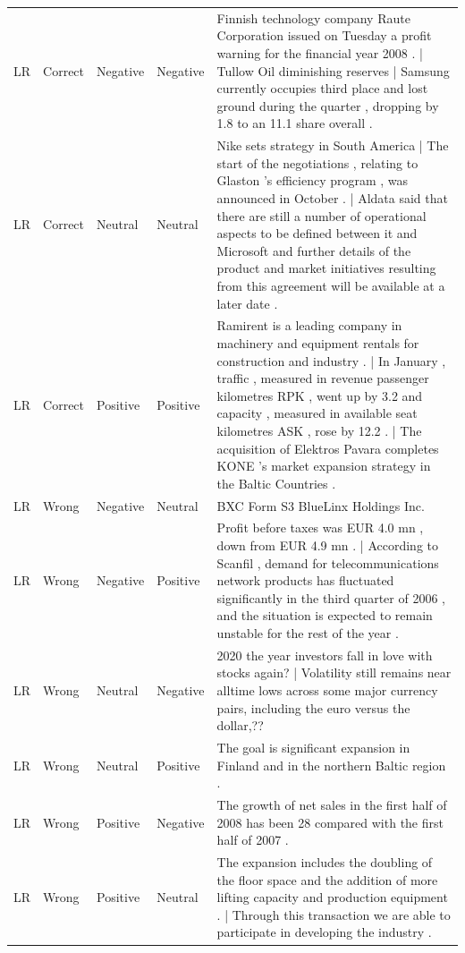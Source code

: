 \begin{longtable}{p{1.8cm}p{1.5cm}p{1.8cm}p{1.8cm}p{16.5cm}}
\bottomrule
\endlastfoot
LR & Correct & Negative & Negative & Finnish technology company Raute Corporation issued on Tuesday a profit warning for the financial year 2008 .    |   Tullow Oil diminishing reserves    |   Samsung currently occupies third place and lost ground during the quarter , dropping by 1.8 to an 11.1 share overall . \\
LR & Correct & Neutral & Neutral & Nike sets strategy in South America    |   The start of the negotiations , relating to Glaston 's efficiency program , was announced in October .    |   Aldata said that there are still a number of operational aspects to be defined between it and Microsoft and further details of the product and market initiatives resulting from this agreement will be available at a later date . \\
LR & Correct & Positive & Positive & Ramirent is a leading company in machinery and equipment rentals for construction and industry .    |   In January , traffic , measured in revenue passenger kilometres RPK , went up by 3.2 and capacity , measured in available seat kilometres ASK , rose by 12.2 .    |   The acquisition of Elektros Pavara completes KONE 's market expansion strategy in the Baltic Countries . \\
LR & Wrong & Negative & Neutral & BXC Form S3 BlueLinx Holdings Inc. \\
LR & Wrong & Negative & Positive & Profit before taxes was EUR 4.0 mn , down from EUR 4.9 mn .    |   According to Scanfil , demand for telecommunications network products has fluctuated significantly in the third quarter of 2006 , and the situation is expected to remain unstable for the rest of the year . \\
LR & Wrong & Neutral & Negative & 2020 the year investors fall in love with stocks again?    |   Volatility still remains near alltime lows across some major currency pairs, including the euro versus the dollar,?? \\
LR & Wrong & Neutral & Positive & The goal is significant expansion in Finland and in the northern Baltic region . \\
LR & Wrong & Positive & Negative & The growth of net sales in the first half of 2008 has been 28 compared with the first half of 2007 . \\
LR & Wrong & Positive & Neutral & The expansion includes the doubling of the floor space and the addition of more lifting capacity and production equipment .    |   Through this transaction we are able to participate in developing the industry . \\

\end{longtable}

